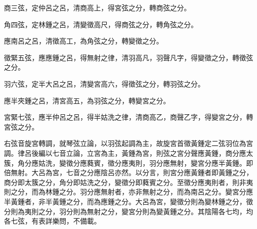 \begin{pinyinscope}
商三弦，定仲呂之呂，清商高上，得宮弦之分，轉商弦之分。

角四弦，定林鍾之呂，清變徵高尺，得商弦之分，轉角弦之分。

應南呂之呂，清徵高工，為角弦之分，轉變徵之分。

徵緊五弦，應應鍾之呂，得無射之律，清羽高凡，羽聲凡字，得變徵之分，轉徵弦之分。

羽六弦，定半大呂之呂，清變宮高六，得徵弦之分，轉羽弦之分。

應半夾鍾之呂，清宮高五，為羽弦之分，轉變宮之分。

宮緊七弦，應半仲呂之呂，得半姑洗之律，清商高乙，商聲乙字，得變宮之分，轉宮弦之分。

右弦音旋宮轉調，就琴弦立論，以羽弦起調為主，故旋宮首徵黃鍾定二弦羽位為宮調。律呂後編以七音立論，立宮為主，黃鍾為宮，則弦之宮分聲應黃鍾，商分應太簇，角分應姑洗，變徵分應蕤賓，徵分應夷則，羽分應無射，變宮分應半黃鍾。即倍無射。大呂為宮，七音之分應陰呂亦然。以分言，則宮分應黃鍾者即黃鍾之分，商分即太簇之分，角分即姑洗之分，變徵分即蕤賓之分。至徵分應夷則者，則非夷則之分，而為林鍾之分。羽分應無射者，亦非無射之分，而為南呂之分。變宮分應半黃鍾者，非半黃鍾之分，而為應鍾之分。大呂為宮，變徵分則為變林鍾之分，徵分則為夷則之分，羽分則為無射之分，變宮分則為變黃鍾之分。其陰陽各七均，均各七弦，有表詳樂問，不備載。


\end{pinyinscope}
